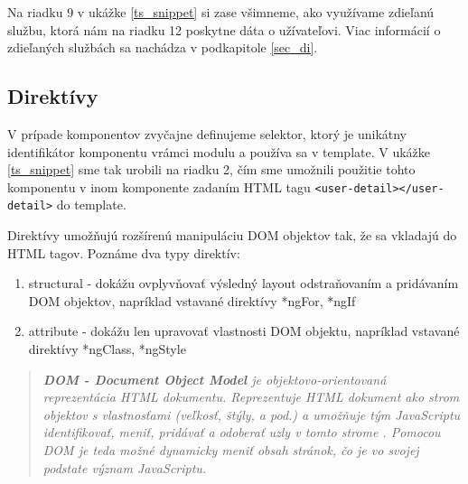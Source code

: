 \documentclass[
  digital, %
  twoside, %
  notable,   %
  nolof,   %
  nolot,   %
]{fithesis3}
\begin{document}
Na riadku 9 v ukážke \ref{ts_snippet} si zase všimneme, ako využívame zdieľanú službu, ktorá nám na riadku 12 poskytne dáta o užívateľovi. Viac informácií o zdieľaných službách sa nachádza v podkapitole \ref{sec_di}.

\subsection{Direktívy}
V prípade komponentov zvyčajne definujeme selektor, ktorý je unikátny identifikátor komponentu vrámci modulu a používa sa v template. V ukážke \ref{ts_snippet} sme tak urobili na riadku 2, čím sme umožnili použitie tohto komponentu v inom komponente zadaním HTML tagu \texttt{<user-detail></user-detail>} do template.

Direktívy umožňujú rozšírenú manipuláciu DOM objektov tak, že sa vkladajú do HTML tagov. Poznáme dva typy direktív\cite{angular}:
\begin{enumerate}
\item structural - dokážu ovplyvňovať výsledný layout odstraňovaním a pridávaním DOM objektov, napríklad vstavané direktívy *ngFor, *ngIf
\item attribute - dokážu len upravovať vlastnosti DOM objektu, napríklad vstavané direktívy *ngClass, *ngStyle
\end{enumerate}

\begin{quote}
\textit{\textbf{DOM - Document Object Model} je objektovo-orientovaná reprezentácia HTML dokumentu. Reprezentuje HTML dokument ako strom objektov s vlastnosťami (veľkosť, štýly, a pod.) a umožňuje tým JavaScriptu identifikovať, meniť, pridávať a odoberať uzly v tomto strome \cite{yang2009topic}. Pomocou DOM je teda možné dynamicky meniť obsah stránok, čo je vo svojej podstate význam JavaScriptu.}
\end{quote}
\end{document}
